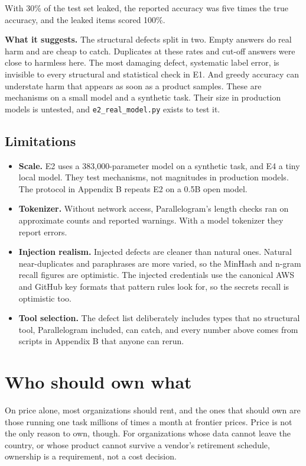 With 30\% of the test set leaked, the reported accuracy was five times the true accuracy, and the leaked items scored 100\%.

\textbf{What it suggests. } The structural defects split in two. Empty answers do real harm and are cheap to catch. Duplicates at these rates and cut-off answers were close to harmless here. The most damaging defect, systematic label error, is invisible to every structural and statistical check in E1. And greedy accuracy can understate harm that appears as soon as a product samples. These are mechanisms on a small model and a synthetic task. Their size in production models is untested, and \texttt{e2\_real\_model.py} exists to test it.

\subsection{Limitations}

\begin{itemize}
\tightlist
\item
  \textbf{Scale.} E2 uses a 383,000-parameter model on a synthetic task, and E4 a tiny local model. They test mechanisms, not magnitudes in production models. The protocol in Appendix B repeats E2 on a 0.5B open model.
\item
  \textbf{Tokenizer.} Without network access, Parallelogram's length checks ran on approximate counts and reported warnings. With a model tokenizer they report errors.
\item
  \textbf{Injection realism.} Injected defects are cleaner than natural ones. Natural near-duplicates and paraphrases are more varied, so the MinHash and n-gram recall figures are optimistic. The injected credentials use the canonical AWS and GitHub key formats that pattern rules look for, so the secrets recall is optimistic too.
\item
  \textbf{Tool selection.} The defect list deliberately includes types that no structural tool, Parallelogram included, can catch, and every number above comes from scripts in Appendix B that anyone can rerun.
\end{itemize}

\section{Who should own what}

On price alone, most organizations should rent, and the ones that should own are those running one task millions of times a month at frontier prices. Price is not the only reason to own, though. For organizations whose data cannot leave the country, or whose product cannot survive a vendor's retirement schedule, ownership is a requirement, not a cost decision.

